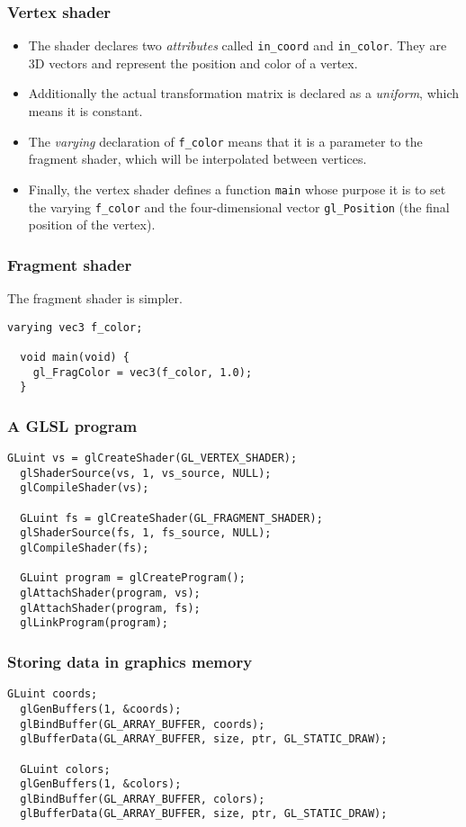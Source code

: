 \begin{frame}
  \frametitle{Vertex shader}
  \begin{itemize}
  \item The shader declares two \emph{attributes} called \texttt{in\_coord} and
    \texttt{in\_color}. They are 3D vectors and represent the position and
    color of a vertex.
  \item Additionally the actual transformation matrix is declared as a
    \emph{uniform}, which means it is constant.
  \item The \emph{varying} declaration of \texttt{f\_color} means that it is a
    parameter to the fragment shader, which will be interpolated between
    vertices.
  \item Finally, the vertex shader defines a function \texttt{main} whose
    purpose it is to set the varying \texttt{f\_color} and the four-dimensional
    vector \texttt{gl\_Position} (the final position of the vertex).
  \end{itemize}
\end{frame}

\begin{frame}[fragile]
  \frametitle{Fragment shader}
  The fragment shader is simpler.
  \begin{lstlisting}[style=glsl]
  varying vec3 f_color;

  void main(void) {
    gl_FragColor = vec3(f_color, 1.0);
  }
  \end{lstlisting}
\end{frame}

\begin{frame}[fragile]
  \frametitle{A GLSL program}
  \begin{lstlisting}[style=c, basicstyle=\ttfamily\footnotesize]
  GLuint vs = glCreateShader(GL_VERTEX_SHADER);
  glShaderSource(vs, 1, vs_source, NULL);
  glCompileShader(vs);

  GLuint fs = glCreateShader(GL_FRAGMENT_SHADER);
  glShaderSource(fs, 1, fs_source, NULL);
  glCompileShader(fs);

  GLuint program = glCreateProgram();
  glAttachShader(program, vs);
  glAttachShader(program, fs);
  glLinkProgram(program);
  \end{lstlisting}
\end{frame}

\begin{frame}[fragile]
  \frametitle{Storing data in graphics memory}
  \begin{lstlisting}[style=c, basicstyle=\ttfamily\footnotesize]
  GLuint coords;
  glGenBuffers(1, &coords);
  glBindBuffer(GL_ARRAY_BUFFER, coords);
  glBufferData(GL_ARRAY_BUFFER, size, ptr, GL_STATIC_DRAW);

  GLuint colors;
  glGenBuffers(1, &colors);
  glBindBuffer(GL_ARRAY_BUFFER, colors);
  glBufferData(GL_ARRAY_BUFFER, size, ptr, GL_STATIC_DRAW);
  \end{lstlisting}
\end{frame}

